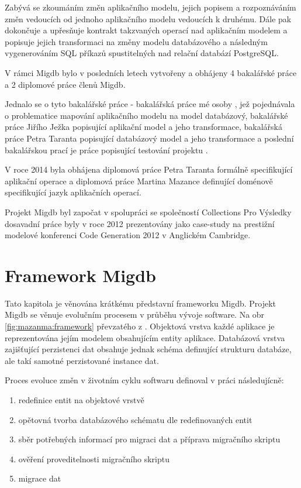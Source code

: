 \documentclass[11pt,twoside,a4paper]{book}
\begin{document}
Zabývá se zkoumáním změn aplikačního modelu, jejich popisem a rozpoznáváním změn
vedoucích od jednoho aplikačního modelu vedoucích k druhému. Dále pak dokončuje a upřesňuje
kontrakt takzvaných operací nad aplikačním modelem a popisuje jejich
transformaci na změny modelu databázového a následným vygenerováním SQL příkazů
spustitelných nad relační databází PostgreSQL.

V rámci Migdb bylo v posledních letech vytvořeny a obhájeny 4 bakalářské práce a
2 diplomové práce členů Migdb.

Jednalo se o tyto bakalářské práce - bakalářská práce mé osoby \cite{Lukes},
jež pojednávala o problematice mapování aplikačního modelu na model databázový,
bakalářské práce Jiřího Ježka \cite{Jezek} popisující aplikační model a jeho
transformace, bakalářská práce Petra Taranta \cite{Tarant_bp} popisující
databázový model a jeho transformace a poslední bakalářskou prací je práce
popisující testování projektu \cite{Luksch}.

V roce 2014 byla obhájena diplomová práce Petra Taranta \cite{Tarant_dip}
formálně specifikující aplikační operace a diplomová práce Martina Mazance
\cite{Mazanec} definující doménově specifikující jazyk aplikačních operací.

Projekt Migdb byl započat v spolupráci se společností Collections Pro Výsledky
dosavadní práce byly v roce 2012 prezentovány jako case-study na prestižní
modelové konferenci Code Generation 2012 \cite{Cambridge} v Anglickém Cambridge.

\section{Framework Migdb}
	
Tato kapitola je věnována krátkému představní frameworku Migdb. Projekt Migdb se
věnuje evolučním procesem v průběhu vývoje software. Na obr
\ref{fig:mazanma:framework} převzatého z \cite{Mazanec}. Objektová vrstva každé
aplikace je reprezentována jejím modelem obsahujícím entity aplikace. Databázová
vrstva zajišťující perzistenci dat obsahuje jednak schéma definující strukturu
databáze, ale takí samotné perzistované instance dat.

Proces evoluce změn v životním cyklu softwaru definoval v práci \cite{Jezek}
následujícně:


\begin{enumerate}\label{framework:jezek_def}
  \item redefinice entit na objektové vrstvě
  \item opětovná tvorba databázového schématu dle redefinovaných entit
  \item sběr potřebných informací pro migraci dat a příprava migračního skriptu
  \item ověření proveditelnosti migračního skriptu
  \item migrace dat
\end{enumerate}
\end{document}
